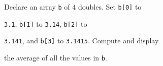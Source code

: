 Declare an array \texttt{b} of 4 doubles. Set \texttt{b[0]} to

\texttt{3.1}, \texttt{b[1]} to \texttt{3.14}, \texttt{b[2]} to

\texttt{3.141}, and \texttt{b[3]} to \texttt{3.1415}. Compute and display

the average of all the values in \texttt{b}.

